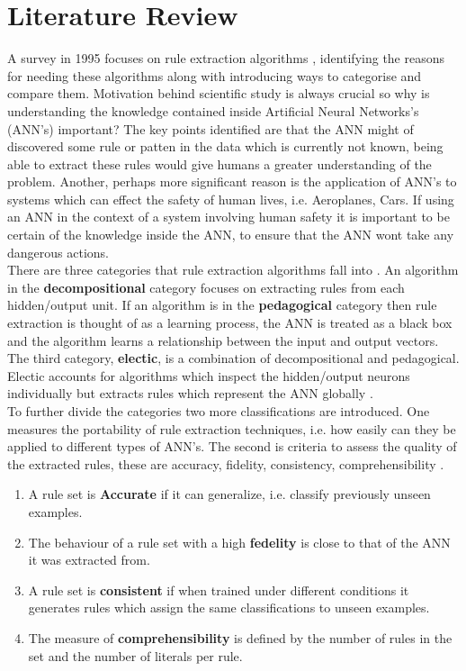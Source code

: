 \section{Literature Review}

A survey in 1995 focuses on rule extraction algorithms \cite{andrews1995survey}, identifying the reasons for needing these algorithms along with introducing ways to categorise and compare them. Motivation behind scientific study is always crucial so why is understanding the knowledge contained inside Artificial Neural Networks's (ANN's) important? The key points identified are that the ANN might of discovered some rule or patten in the data which is currently not known, being able to extract these rules would give humans a greater understanding of the problem. Another, perhaps more significant reason is the application of ANN's to systems which can effect the safety of human lives, i.e. Aeroplanes, Cars. If using an ANN in the context of a system involving human safety it is important to be certain of the knowledge inside the ANN, to ensure that the ANN wont take any dangerous actions.\\

There are three categories that rule extraction algorithms fall into \cite{andrews1995survey}. An algorithm in the \textbf{decompositional} category focuses on extracting rules from each hidden/output unit. If an algorithm is in the \textbf{pedagogical} category then rule extraction is thought of as a learning process, the ANN is treated as a black box and the algorithm learns a relationship between the input and output vectors. The third category, \textbf{electic}, is a combination of decompositional and pedagogical. Electic accounts for algorithms which inspect the hidden/output neurons individually but extracts rules which represent the ANN globally \cite{tickle1998truth}.\\

To further divide the categories two more classifications are introduced. One measures the portability of rule extraction techniques, i.e. how easily can they be applied to different types of ANN's. The second is criteria to assess the quality of the extracted rules, these are accuracy, fidelity, consistency, comprehensibility \cite{andrews1995survey}.

\begin{enumerate}
\item A rule set is \textbf{Accurate} if it can generalize, i.e. classify previously unseen examples.
\item The behaviour of a rule set with a high \textbf{fedelity} is close to that of the ANN it was extracted from.
\item A rule set is \textbf{consistent} if when trained under different conditions it generates rules which assign the same classifications to unseen examples.
\item The measure of \textbf{comprehensibility} is defined by the number of rules in the set and the number of literals per rule.
\end{enumerate}


